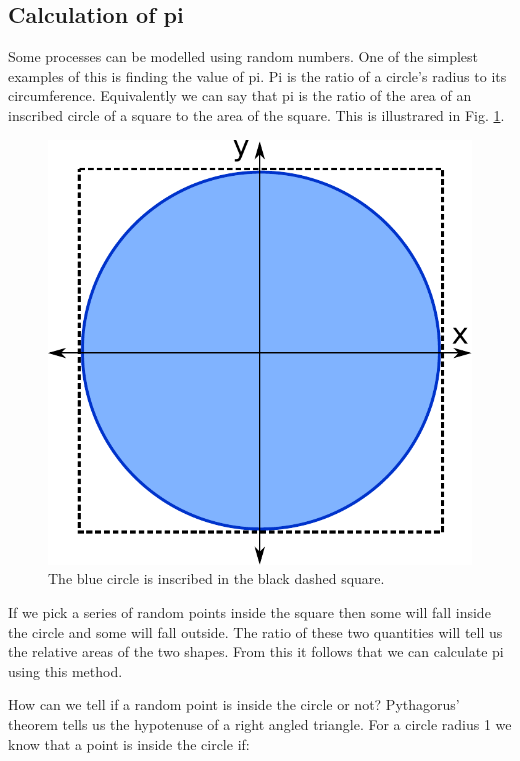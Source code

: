 	\subsection{Calculation of pi}\label{pi_exercise}
		Some processes can be modelled using random numbers. One of the simplest examples of this is finding the value of pi. Pi is the ratio of a circle's radius to its circumference. Equivalently we can say that pi is the ratio of the area of an inscribed circle of a square to the area of the square. This is illustrared in Fig. \ref{fig:picircle}. 
	\begin{figure}[h]
		\centering
		\includegraphics[scale=0.4]{images/pi}
		\caption{The blue circle is inscribed in the black dashed square.}
		\label{fig:picircle}
	\end{figure}

	If we pick a series of random points inside the square then some will fall inside the circle and some will fall outside. The ratio of these two quantities will tell us the relative areas of the two shapes. From this it follows that we can calculate pi using this method.

	How can we tell if a random point is inside the circle or not? Pythagorus' theorem tells us the hypotenuse of a right angled triangle. For a circle radius 1 we know that a point is inside the circle if:

